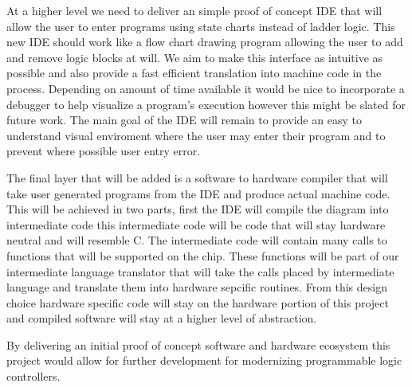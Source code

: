 At a higher level we need to deliver an simple proof of concept IDE that will allow the user to enter programs using state charts instead of ladder logic. This new IDE should work like a flow chart drawing program allowing the user to add and remove logic blocks at will. We aim to make this interface as intuitive as possible and also provide a fast efficient translation into machine code in the process. Depending on amount of time available it would be nice to incorporate a debugger to help visualize a program's execution however this might be slated for future work. The main goal of the IDE will remain to provide an easy to understand visual enviroment where the user may enter their program and to prevent where possible user entry error.

The final layer that will be added is a software to hardware compiler that will take user generated programs from the IDE and produce actual machine code. This will be achieved in two parts, first the IDE will compile the diagram into intermediate code this intermediate code will be code that will stay hardware neutral and will resemble C. The intermediate code will contain many calls to functions that will be supported on the chip. These functions will be part of our intermediate language translator that will take the calls placed by intermediate language and translate them into hardware sepcific routines. From this design choice hardware specific code will stay on the hardware portion of this project and compiled software will stay at a higher level of abstraction.

By delivering an initial proof of concept software and hardware ecosystem this project would allow for further development for modernizing programmable logic controllers.

